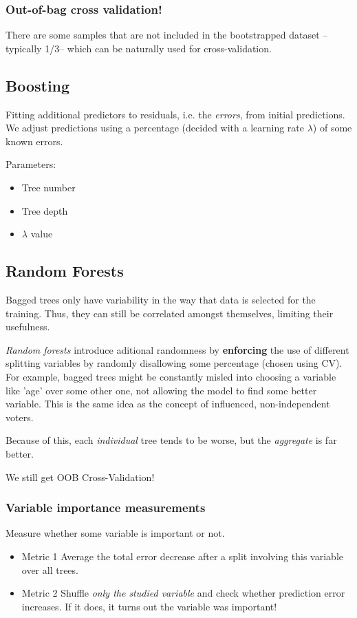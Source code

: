 \documentclass[11pt]{article}
\begin{document}
\subsubsection*{Out-of-bag cross validation!}
\label{sec-1-3-1}
There are some samples that are not included in the bootstrapped dataset --typically 1/3-- which can be naturally used for cross-validation.
\subsection*{Boosting}
\label{sec-1-4}
Fitting additional predictors to residuals, i.e. the \emph{errors}, from initial predictions. We adjust predictions using a percentage (decided with a learning rate $\lambda$) of some known errors.

Parameters:
\begin{itemize}
\item Tree number
\item Tree depth
\item $\lambda$ value
\end{itemize}
\subsection*{Random Forests}
\label{sec-1-5}
Bagged trees only have variability in the way that data is selected for the training. Thus, they can still be correlated amongst themselves, limiting their usefulness.

\emph{Random forests} introduce aditional randomness by \textbf{enforcing} the use of different splitting variables by randomly disallowing some percentage (chosen using CV). For example, bagged trees might be constantly misled into choosing a variable like 'age' over some other one, not allowing the model to find some better variable. This is the same idea as the concept of influenced, non-independent voters.

Because of this, each \emph{individual} tree tends to be worse, but the \emph{aggregate} is far better.

We still get OOB Cross-Validation!
\subsubsection*{Variable importance measurements}
\label{sec-1-5-1}
Measure whether some variable is important or not.
\begin{itemize}
\item Metric 1
\label{sec-1-5-1-1}
Average the total error decrease after a split involving this variable over all trees.
\item Metric 2
\label{sec-1-5-1-2}
Shuffle \emph{only the studied variable} and check whether prediction error increases. If it does, it turns out the variable was important!
\end{itemize}
\end{document}
